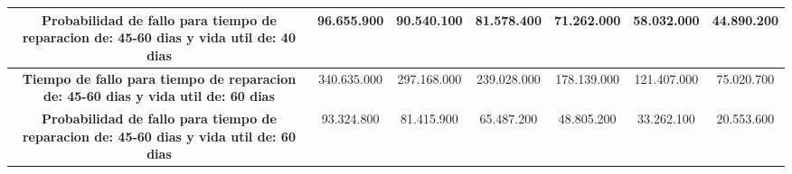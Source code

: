 \begin{table}[h]
{\begin{tabular}{|c|cccccc|}
\textbf{Probabilidad de fallo para tiempo de reparacion de: 45-60 dias y vida util de: 40 dias} & 96.655.900  & 90.540.100  & 81.578.400  & 71.262.000  & 58.032.000  & 44.890.200  \\ \hline
\textbf{Tiempo de fallo para tiempo de reparacion de: 45-60 dias y vida util de: 60 dias}       & 340.635.000 & 297.168.000 & 239.028.000 & 178.139.000 & 121.407.000 & 75.020.700  \\ \hline
\textbf{Probabilidad de fallo para tiempo de reparacion de: 45-60 dias y vida util de: 60 dias} & 93.324.800  & 81.415.900  & 65.487.200  & 48.805.200  & 33.262.100  & 20.553.600  \\ \hline
\end{tabular}%
}
\end{table}


